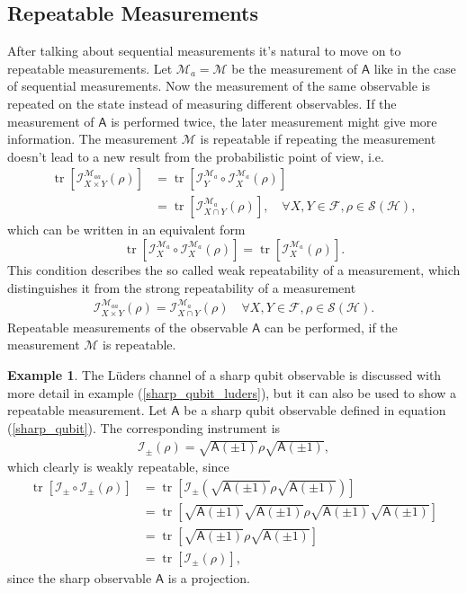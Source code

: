 \documentclass[a4paper,12pt]{wihuri}
\theoremstyle{definition}
\newtheorem{example}{Example}
\numberwithin{definition}{section}
\numberwithin{example}{section}
\numberwithin{theorem}{section}
\numberwithin{proposition}{section}
\numberwithin{lemma}{section}
\newcommand{\I}{\mathcal{I}}%
\newcommand{\hi}{\mathcal{H}}%
\newcommand{\salg}{\mathcal{F}}%
\newcommand{\tila}{\mathcal{S}}%
\newcommand{\mm}{\mathcal{M}}%
\newcommand{\A}{\mathsf{A}}%
\DeclareMathOperator{\tr}{tr}
\begin{document}
\subsection{Repeatable Measurements}\label{sec_repeatable}
After talking about sequential measurements it's natural to move on to repeatable measurements. Let $\mm_a = \mm$ be the measurement of $\A$ like in the case of sequential measurements. Now the measurement of the same observable is repeated on the state instead of measuring different observables. If the measurement of $\A$ is performed twice, the later measurement might give more information. The measurement $\mm$ is repeatable if repeating the measurement doesn't lead to a new result from the probabilistic point of view, i.e.
\begin{align*}
\tr[\I_{X \times Y}^{\mm_{aa}}(\rho)] &= \tr[\I_Y^{\mm_a} \circ \I_X^{\mm_a}(\rho)] \\ 
&= \tr[\I_{X \cap Y}^{\mm_a}(\rho)], \quad \forall X,Y \in \salg, \rho \in \tila(\hi),
\end{align*}
which can be written in an equivalent form
\begin{equation}
\tr[\I_X^{\mm_a} \circ \I_X^{\mm_a}(\rho)]  = \tr[\I_X^{\mm_a}(\rho)]\text{.}
\end{equation}
This condition describes the so called weak repeatability of a measurement, which distinguishes it from the strong repeatability of a measurement
\begin{align*}
\I_{X \times Y}^{\mm_{aa}}(\rho) = \I_{X \cap Y}^{\mm_a}(\rho) \quad \forall X,Y \in \salg, \rho \in \tila(\hi)\text{.}
\end{align*}
Repeatable measurements of the observable $\A$ can be performed, if the measurement $\mm$ is repeatable. 
\begin{example}
The Lüders channel of a sharp qubit observable is discussed with more detail in example (\ref{sharp_qubit_luders}), but it can also be used to show a repeatable measurement. Let $\A$ be a sharp qubit observable defined in equation (\ref{sharp_qubit}). The corresponding instrument is
\begin{align*}
\I_\pm(\rho) = \sqrt{\A(\pm 1)} \rho\sqrt{\A(\pm 1)},
\end{align*}
which clearly is weakly repeatable, since
\begin{align*}
\tr[\I_\pm \circ \I_\pm(\rho)] &= \tr[\I_\pm(\sqrt{\A(\pm 1)}\rho\sqrt{\A(\pm 1)})]\\
&= \tr[\sqrt{\A(\pm 1)}\sqrt{\A(\pm 1)}\rho\sqrt{\A(\pm 1)}\sqrt{\A(\pm 1)}]\\
&= \tr[\sqrt{\A(\pm 1)}\rho\sqrt{\A(\pm 1)}]\\
&= \tr[\I_\pm(\rho)],
\end{align*}
since the sharp observable $\A$ is a projection.


\end{example}
\end{document}
